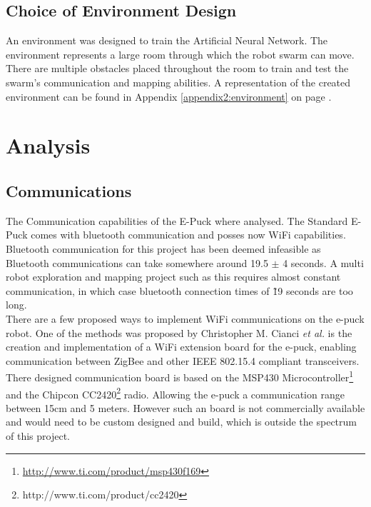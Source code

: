 \subsection{Choice of Environment Design}
An environment was designed to train the Artificial Neural Network.
The environment represents a large room through which the robot swarm can move. There are multiple obstacles placed throughout the room to train and test the swarm's communication and mapping abilities. A representation of the created environment can be found in Appendix  \ref{appendix2:environment} on page \pageref{appendix2:environment}. \\

\section{Analysis}

\subsection{Communications}
\label{chap1:communication}
The Communication capabilities of the E-Puck where analysed. The Standard E-Puck comes  with bluetooth communication and posses now WiFi capabilities. \\
Bluetooth  communication for this project has been deemed infeasible as Bluetooth communications can take somewhere around 19.5 $\pm$ 4 seconds. A multi robot exploration and mapping project such as this requires almost constant communication, in which case bluetooth connection times of \~19 seconds are too long.\\

There are a few proposed ways to implement WiFi communications on the e-puck robot. 
One of the methods was proposed by Christopher M. Cianci \textit{et al.}\cite{Cianci2007Communication} is the creation and implementation of a WiFi extension board for the e-puck, enabling communication between ZigBee and other IEEE 802.15.4 compliant transceivers. 
There designed communication board is based on the MSP430 Microcontroller\footnote{\url{http://www.ti.com/product/msp430f169}} and the Chipcon CC2420\footnote{http://www.ti.com/product/cc2420} radio.
Allowing the e-puck a communication range between 15cm and 5 meters. 
However such an board is not commercially available and would need to be custom designed and build, which is outside the spectrum of this project.

